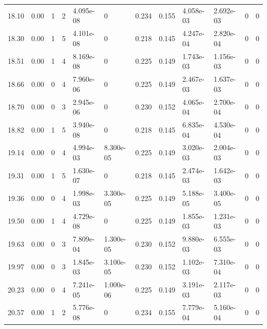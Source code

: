 \documentclass[preview]{standalone}
\begin{document}
{{{\begin{tabular}{L{1.2cm}C{1.2cm} C{0.3cm}C{0.5cm} C{1.4cm}C{1.4cm} C{1.4cm}C{1.4cm} C{1.6cm}C{1.6cm} C{1.6cm}C{1.6cm}}
  18.10  &  0.00  & 1     &  2 &  4.095e-08  & 0  &  0.234&   0.155& 4.058e-03 & 2.692e-03   &  0 & 0  \\ 
  18.30  &  0.00  & 1     &  5 &  4.101e-08  & 0  &  0.218&   0.145& 4.247e-04 & 2.820e-04   &  0 & 0  \\ 
  18.51  &  0.00  & 1     &  4 &  8.169e-08  & 0  &  0.225&   0.149& 1.743e-03 & 1.156e-03   &  0 & 0  \\ 
  18.66  &  0.00  & 0     &  4 &  7.960e-06  & 0  &  0.225&   0.149& 2.467e-03 & 1.637e-03   &  0 & 0  \\ 
  18.70  &  0.00  & 0     &  3 &  2.945e-06  & 0  &  0.230&   0.152& 4.065e-04 & 2.700e-04   &  0 & 0  \\ 
  18.82  &  0.00  & 1     &  5 &  3.940e-08  & 0  &  0.218&   0.145& 6.835e-04 & 4.530e-04   &  0 & 0  \\ 
  19.14  &  0.00  & 0     &  4 &  4.994e-03  & 8.300e-05  &  0.225&   0.149& 3.020e-03 & 2.004e-03   &  0 & 0  \\ 
  19.31  &  0.00  & 1     &  5 &  1.630e-07  & 0  &  0.218&   0.145& 2.474e-03 & 1.642e-03   &  0 & 0  \\ 
  19.36  &  0.00  & 0     &  4 &  1.998e-03  & 3.300e-05  &  0.225&   0.149& 5.188e-05 & 3.400e-05   &  0 & 0  \\ 
  19.50  &  0.00  & 1     &  4 &  4.729e-08  & 0  &  0.225&   0.149& 1.855e-03 & 1.231e-03   &  0 & 0  \\ 
  19.63  &  0.00  & 0     &  3 &  7.809e-04  & 1.300e-05  &  0.230&   0.152& 9.880e-03 & 6.555e-03   &  0 & 0  \\ 
  19.97  &  0.00  & 0     &  3 &  1.845e-03  & 3.100e-05  &  0.230&   0.152& 1.102e-03 & 7.310e-04   &  0 & 0  \\ 
  20.23  &  0.00  & 0     &  4 &  7.241e-05  & 1.000e-06  &  0.225&   0.149& 3.191e-03 & 2.117e-03   &  0 & 0  \\ 
  20.57  &  0.00  & 1     &  2 &  5.776e-08  & 0  &  0.234&   0.155& 7.779e-04 & 5.160e-04   &  0 & 0  \\ 
\hline 
\end{tabular} 

}}}
\end{document}
